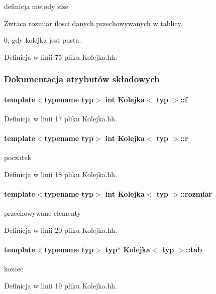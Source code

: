 definicja metody size 

\begin{DoxyReturn}{Zwraca}
rozmiar ilosci danych przechowywanych w tablicy. 

0, gdy kolejka jest pusta. 
\end{DoxyReturn}


Definicja w linii 75 pliku Kolejka.\+hh.



\subsubsection{Dokumentacja atrybutów składowych}
\hypertarget{class_kolejka_aa533196e5ca1ca0033142a1588000edd}{}
\paragraph[{f}]{\setlength{\rightskip}{0pt plus 5cm}template$<$typename typ$>$ int {\bf Kolejka}$<$ typ $>$\+::f\hspace{0.3cm}{\ttfamily [private]}}\label{class_kolejka_aa533196e5ca1ca0033142a1588000edd}


Definicja w linii 17 pliku Kolejka.\+hh.

\hypertarget{class_kolejka_aa26f38fd232737021fb82f5d8e86c724}{}
\paragraph[{r}]{\setlength{\rightskip}{0pt plus 5cm}template$<$typename typ$>$ int {\bf Kolejka}$<$ typ $>$\+::r\hspace{0.3cm}{\ttfamily [private]}}\label{class_kolejka_aa26f38fd232737021fb82f5d8e86c724}
poczatek 

Definicja w linii 18 pliku Kolejka.\+hh.

\hypertarget{class_kolejka_a031fd520e5f22daac808dbeeb705832a}{}
\paragraph[{rozmiar}]{\setlength{\rightskip}{0pt plus 5cm}template$<$typename typ$>$ int {\bf Kolejka}$<$ typ $>$\+::rozmiar\hspace{0.3cm}{\ttfamily [private]}}\label{class_kolejka_a031fd520e5f22daac808dbeeb705832a}
przechowywane elementy 

Definicja w linii 20 pliku Kolejka.\+hh.

\hypertarget{class_kolejka_a333beaaaf8ccecbfd4b84a7840d3bd33}{}
\paragraph[{tab}]{\setlength{\rightskip}{0pt plus 5cm}template$<$typename typ$>$ typ$\ast$ {\bf Kolejka}$<$ typ $>$\+::tab\hspace{0.3cm}{\ttfamily [private]}}\label{class_kolejka_a333beaaaf8ccecbfd4b84a7840d3bd33}
koniec 

Definicja w linii 19 pliku Kolejka.\+hh.

